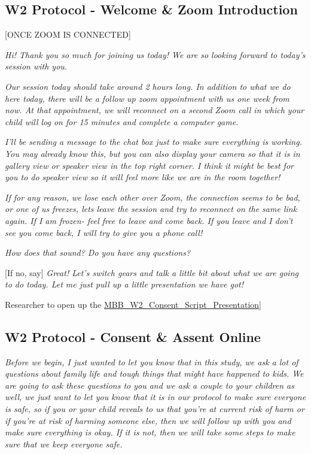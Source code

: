 \documentclass[
]{book}
\begin{document}
\hypertarget{w2-protocol---welcome-zoom-introduction}{%
\subsection{W2 Protocol - Welcome \& Zoom Introduction}\label{w2-protocol---welcome-zoom-introduction}}

{[}ONCE ZOOM IS CONNECTED{]}

\emph{Hi! Thank you so much for joining us today! We are so looking forward to today's session with you. }

\emph{Our session today should take around 2 hours long. In addition to what we do here today, there will be a follow up zoom appointment with us one week from now. At that appointment, we will reconnect on a second Zoom call in which your child will log on for 15 minutes and complete a computer game.}

\emph{I'll be sending a message to the chat box just to make sure everything is working. You may already know this, but you can also display your camera so that it is in gallery view or speaker view in the top right corner. I think it might be best for you to do speaker view so it will feel more like we are in the room together!}

\emph{If for any reason, we lose each other over Zoom, the connection seems to be bad, or one of us freezes, lets leave the session and try to reconnect on the same link again. If I am frozen- feel free to leave and come back. If you leave and I don't see you come back, I will try to give you a phone call!}

\emph{How does that sound? Do you have any questions?}

{[}If no, say{]} \emph{Great! Let's switch gears and talk a little bit about what we are going to do today. Let me just pull up a little presentation we have got!}

Researcher to open up the \href{https://app.box.com/file/777489326925}{MBB\_W2\_Consent\_Script\_Presentation}{]}

\hypertarget{w2-protocol---consent-assent-online}{%
\subsection{W2 Protocol - Consent \& Assent Online}\label{w2-protocol---consent-assent-online}}

\emph{Before we begin, I just wanted to let you know that in this study, we ask a lot of questions about family life and tough things that might have happened to kids. We are going to ask these questions to you and we ask a couple to your children as well, we just want to let you know that it is in our protocol to make sure everyone is safe, so if you or your child reveals to us that you're at current risk of harm or if you're at risk of harming someone else, then we will follow up with you and make sure everything is okay. If it is not, then we will take some steps to make sure that we keep everyone safe.}
\end{document}
